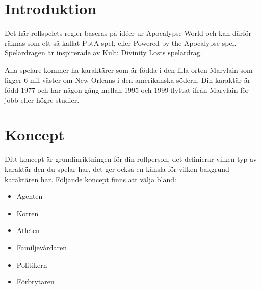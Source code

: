 \documentclass[a5paper,10pt]{article}
\begin{document}
\maketitle
\clearpage
\section{Introduktion}
Det här rollspelets regler baseras på idéer ur Apocalypse World och kan därför räknas som ett så kallat PbtA spel, eller Powered by the Apocalypse spel. Spelardragen är inspirerade av Kult: Divinity Losts spelardrag.

Alla spelare kommer ha karaktärer som är födda i den lilla orten Marylain som ligger 6 mil väster om New Orleans i den amerikanska södern. Din karaktär är född 1977 och har någon gång mellan 1995 och 1999 flyttat ifrån Marylain för jobb eller högre studier.
\section{Koncept}
Ditt koncept är grundinriktningen för din rollperson, det definierar vilken typ av karaktär den du spelar har, det ger också en känsla för vilken bakgrund karaktären har. Följande koncept finns att välja bland:
\begin{itemize}
  \item Agenten
  \item Korren
  \item Atleten
  \item Familjevårdaren
  \item Politikern
  \item Förbrytaren
\end{itemize}
\end{document}
